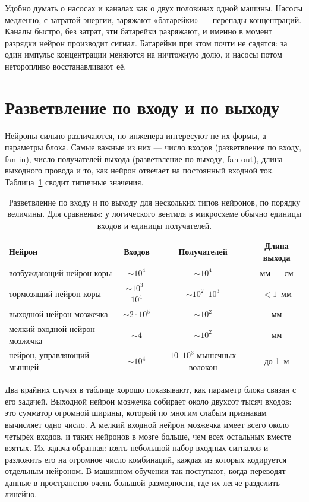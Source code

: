 Удобно думать о насосах и каналах как о двух половинах одной машины. Насосы медленно, с затратой энергии, заряжают «батарейки» --- перепады концентраций. Каналы быстро, без затрат, эти батарейки разряжают, и именно в момент разрядки нейрон производит сигнал. Батарейки при этом почти не садятся: за один импульс концентрации меняются на ничтожную долю, и насосы потом неторопливо восстанавливают её.

\section{Разветвление по входу и по выходу}

Нейроны сильно различаются, но инженера интересуют не их формы, а параметры блока. Самые важные из них --- число входов (разветвление по входу, fan-in), число получателей выхода (разветвление по выходу, fan-out), длина выходного провода и то, как нейрон отвечает на постоянный входной ток. Таблица~\ref{tab:fan} сводит типичные значения.

\begin{table}[t]
\centering
\small
\begin{tabular}{>{\raggedright}p{3.6cm}ccc}
\toprule
Нейрон & Входов & Получателей & Длина выхода \\
\midrule
возбуждающий нейрон коры & $\sim10^4$ & $\sim10^4$ & мм --- см \\
тормозящий нейрон коры & $\sim10^3$--$10^4$ & $\sim10^2$--$10^3$ & $<1$~мм \\
выходной нейрон мозжечка & $\sim2\cdot10^5$ & $\sim10^2$ & мм \\
мелкий входной нейрон мозжечка & $\sim4$ & $\sim10^2$ & мм \\
нейрон, управляющий мышцей & $\sim10^4$ & $10$--$10^3$ мышечных волокон & до 1~м \\
\bottomrule
\end{tabular}
\caption{Разветвление по входу и по выходу для нескольких типов нейронов, по порядку величины. Для сравнения: у логического вентиля в микросхеме обычно единицы входов и единицы получателей.}
\label{tab:fan}
\end{table}

Два крайних случая в таблице хорошо показывают, как параметр блока связан с его задачей. Выходной нейрон мозжечка собирает около двухсот тысяч входов: это сумматор огромной ширины, который по многим слабым признакам вычисляет одно число. А мелкий входной нейрон мозжечка имеет всего около четырёх входов, и таких нейронов в мозге больше, чем всех остальных вместе взятых. Их задача обратная: взять небольшой набор входных сигналов и разложить его на огромное число комбинаций, каждая из которых кодируется отдельным нейроном. В машинном обучении так поступают, когда переводят данные в пространство очень большой размерности, где их легче разделить линейно.

